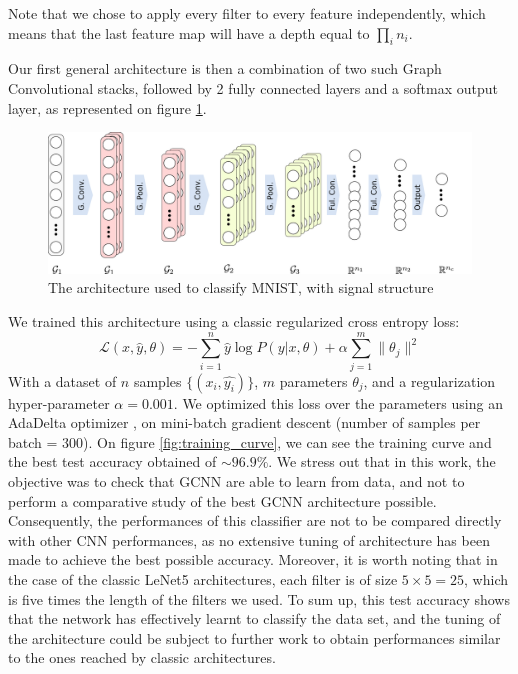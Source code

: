 Note that we chose to apply every filter to every feature independently, which means that the last feature map will have a depth equal to $\prod_i n_i$. 

Our first general architecture is then a combination of two such Graph Convolutional stacks, followed by 2 fully connected layers and a softmax output layer, as represented on figure \ref{fig:mnist_classifier}. 

\begin{figure}
    \centering
    \includegraphics[width=\textwidth]{img/classifier.pdf}
    \caption{The architecture used to classify MNIST, with signal structure }
    \label{fig:mnist_classifier}
\end{figure}

We trained this architecture using a classic regularized cross entropy loss:
\begin{equation}
    \mathcal{L}(x,\hat{y},\theta) = -\sum_{i=1}^n \hat{y}\log P(y|x,\theta) + \alpha \sum_{j=1}^m \|\theta_j\|^2
\end{equation}
With a dataset of $n$ samples $\{(x_i, \hat{y_i})\}$, $m$ parameters $\theta_j$, and a regularization hyper-parameter $\alpha = 0.001$. We optimized this loss over the parameters using an AdaDelta optimizer \cite{Zeiler2012}, on mini-batch gradient descent (number of samples per batch = 300). On figure \ref{fig:training_curve}, we can see the training curve and the best test accuracy obtained of $\sim 96.9\%$. We stress out that in this work, the objective was to check that GCNN are able to learn from data, and not to perform a comparative study of the best GCNN architecture possible. Consequently, the performances of this classifier are not to be compared directly with other CNN performances, as no extensive tuning of architecture has been made to achieve the best possible accuracy. Moreover, it is worth noting that in the case of the classic LeNet5 architectures, each filter is of size $5\times5=25$, which is five times the length of the filters we used. To sum up, this test accuracy shows that the network has effectively learnt to classify the data set, and the tuning of the architecture could be subject to further work to obtain performances similar to the ones reached by classic architectures. 

